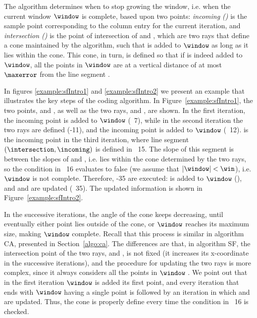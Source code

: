 The algorithm determines when to stop growing the window, i.e. when the current window $\window$ is complete, based upon two points: \textit{incoming (\incoming)} is the sample point corresponding to the column entry for the current iteration, and \textit{intersection (\intersection)} is the point of intersection of \smin and \smax, which are two rays that define a cone maintained by the algorithm, such that \incoming is added to $\window$ as long as it lies within the cone. This cone, in turn, is defined so that if \incoming is indeed added to $\window$, all the points in $\window$ are at a vertical distance of at most $\maxerror$ from the line segment \interSegmentSF.


In figures \ref{example:sfIntro1} and \ref{example:sfIntro2} we present an example that illustrates the key steps of the coding algorithm. In Figure~\ref{example:sfIntro1}, the two points, \incoming and \intersection, as well as the two rays, \smin and \smax, are shown. In the first iteration, the incoming point is added to $\window$ (\Line~7), while in the second iteration the two rays are defined (-11), and the incoming point is added to $\window$ (\Line~12). \incoming is the incoming point in the third iteration, where line segment $(\intersection, \incoming)$ is defined in \Line~15. The slope of this segment is between the slopes of \smin and \smax, i.e. \incoming lies within the cone determined by the two rays, so the condition in \Line~16 evaluates to false (we assume that $|\window|<\win$), i.e. $\window$ is not complete. Therefore, -35 are executed: \incoming is added to $\window$ (), and \smin and \smax are updated (\Line~35). The updated information is shown in Figure~\ref{example:sfIntro2}.


\vspace{+5pt}
\exampleSF


\clearpage


In the successive iterations, the angle of the cone keeps decreasing, until eventually either point \incoming lies outside of the cone, or $\window$ reaches its maximum size, making $\window$ complete. Recall that this process is similar in algorithm CA, presented in Section~\ref{algo:ca}. The differences are that, in algorithm SF, the intersection point of the two rays, \smin and \smax, is not fixed (it increases its x-coordinate in the successive iterations), and the procedure for updating the two rays is more complex, since it always considers all the points in $\window$ \cite{coder:sf}. We point out that in the first iteration $\window$ is added its first point, and every iteration that ends with $\window$ having a single point is followed by an iteration in which \smin and \smax are updated. Thus, the cone is properly define every time the condition in \Line~16 is checked.


